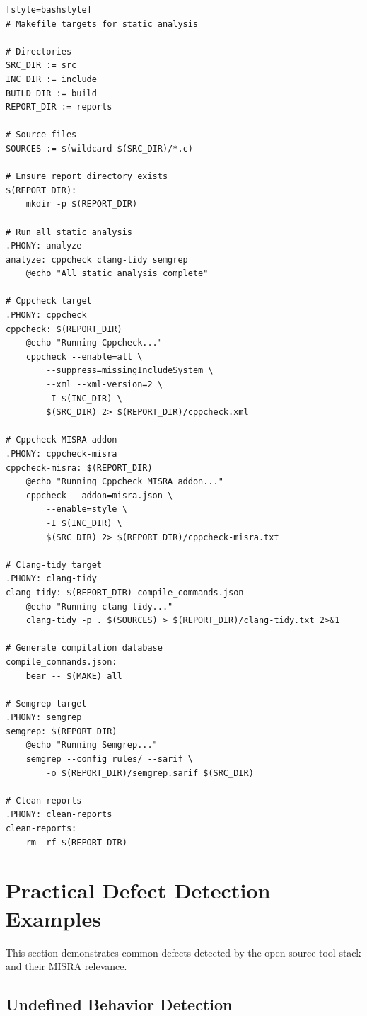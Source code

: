 \documentclass[11pt,letterpaper]{report}
\begin{document}
\begin{verbatim}[style=bashstyle]
# Makefile targets for static analysis

# Directories
SRC_DIR := src
INC_DIR := include
BUILD_DIR := build
REPORT_DIR := reports

# Source files
SOURCES := $(wildcard $(SRC_DIR)/*.c)

# Ensure report directory exists
$(REPORT_DIR):
	mkdir -p $(REPORT_DIR)

# Run all static analysis
.PHONY: analyze
analyze: cppcheck clang-tidy semgrep
	@echo "All static analysis complete"

# Cppcheck target
.PHONY: cppcheck
cppcheck: $(REPORT_DIR)
	@echo "Running Cppcheck..."
	cppcheck --enable=all \
		--suppress=missingIncludeSystem \
		--xml --xml-version=2 \
		-I $(INC_DIR) \
		$(SRC_DIR) 2> $(REPORT_DIR)/cppcheck.xml

# Cppcheck MISRA addon
.PHONY: cppcheck-misra
cppcheck-misra: $(REPORT_DIR)
	@echo "Running Cppcheck MISRA addon..."
	cppcheck --addon=misra.json \
		--enable=style \
		-I $(INC_DIR) \
		$(SRC_DIR) 2> $(REPORT_DIR)/cppcheck-misra.txt

# Clang-tidy target
.PHONY: clang-tidy
clang-tidy: $(REPORT_DIR) compile_commands.json
	@echo "Running clang-tidy..."
	clang-tidy -p . $(SOURCES) > $(REPORT_DIR)/clang-tidy.txt 2>&1

# Generate compilation database
compile_commands.json:
	bear -- $(MAKE) all

# Semgrep target
.PHONY: semgrep
semgrep: $(REPORT_DIR)
	@echo "Running Semgrep..."
	semgrep --config rules/ --sarif \
		-o $(REPORT_DIR)/semgrep.sarif $(SRC_DIR)

# Clean reports
.PHONY: clean-reports
clean-reports:
	rm -rf $(REPORT_DIR)
\end{verbatim}

\chapter{Practical Defect Detection Examples}

This section demonstrates common defects detected by the open-source tool stack and their MISRA relevance.

\section{Undefined Behavior Detection}
\end{document}

